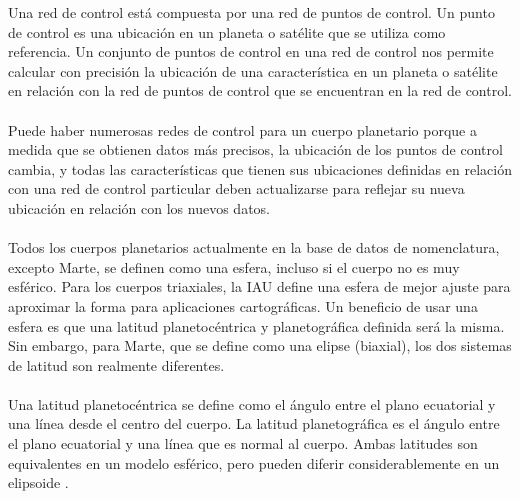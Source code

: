 \documentclass[12pt]{article}
\begin{document}
Una red de control está compuesta por una red de puntos de control. Un punto de control es una ubicación en un planeta 
o satélite que se utiliza como referencia. Un conjunto de puntos de control en una red de control nos permite calcular 
con precisión la ubicación de una característica en un planeta o satélite en relación con la red de puntos de control 
que se encuentran en la red de control.\\
\\
Puede haber numerosas redes de control para un cuerpo planetario porque a medida que se obtienen datos más precisos, 
la ubicación de los puntos de control cambia, y todas las características que tienen sus ubicaciones definidas en 
relación con una red de control particular deben actualizarse para reflejar su nueva ubicación en relación con los 
nuevos datos.\\
\\
Todos los cuerpos planetarios actualmente en la base de datos de nomenclatura, excepto Marte, se definen como una esfera, 
incluso si el cuerpo no es muy esférico. Para los cuerpos triaxiales, la IAU define una esfera de mejor ajuste para 
aproximar la forma para aplicaciones cartográficas. Un beneficio de usar una esfera es que una latitud planetocéntrica 
y planetográfica definida será la misma. Sin embargo, para Marte, que se define como una elipse (biaxial), los dos 
sistemas de latitud son realmente diferentes.\\
\\
Una latitud planetocéntrica se define como el ángulo entre el plano ecuatorial y una línea desde el centro del cuerpo. 
La latitud planetográfica es el ángulo entre el plano ecuatorial y una línea que es normal al cuerpo. Ambas latitudes 
son equivalentes en un modelo esférico, pero pueden diferir considerablemente en un elipsoide \parencite{iau_control_networks}.\\
\end{document}
